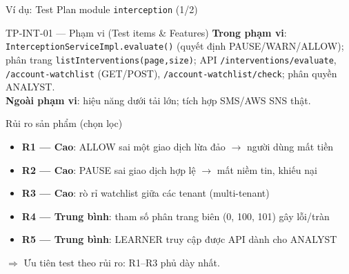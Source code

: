 \documentclass[aspectratio=169,12pt]{beamer}
\begin{document}
\begin{frame}[shrink=8]{Ví dụ: Test Plan module \texttt{interception} (1/2)}
  \small
  \begin{block}{TP-INT-01 --- Phạm vi (Test items \& Features)}
    \textbf{Trong phạm vi}: \texttt{InterceptionServiceImpl.evaluate()} (quyết định
    PAUSE/WARN/ALLOW); phân trang \texttt{listInterventions(page,size)}; API
    \texttt{/interventions/evaluate}, \texttt{/account-watchlist} (GET/POST),
    \texttt{/account-watchlist/check}; phân quyền ANALYST.\\
    \textbf{Ngoài phạm vi}: hiệu năng dưới tải lớn; tích hợp SMS/AWS SNS thật.
  \end{block}

  \begin{block}{Rủi ro sản phẩm (chọn lọc)}
    \begin{itemize}
      \item \textbf{R1 --- Cao}: ALLOW sai một giao dịch lừa đảo $\to$ người dùng mất tiền
      \item \textbf{R2 --- Cao}: PAUSE sai giao dịch hợp lệ $\to$ mất niềm tin, khiếu nại
      \item \textbf{R3 --- Cao}: rò rỉ watchlist giữa các tenant (multi-tenant)
      \item \textbf{R4 --- Trung bình}: tham số phân trang biên (0, 100, 101) gây lỗi/tràn
      \item \textbf{R5 --- Trung bình}: LEARNER truy cập được API dành cho ANALYST
    \end{itemize}
    $\Rightarrow$ Ưu tiên test theo rủi ro: R1--R3 phủ dày nhất.
  \end{block}
\end{frame}
\end{document}
